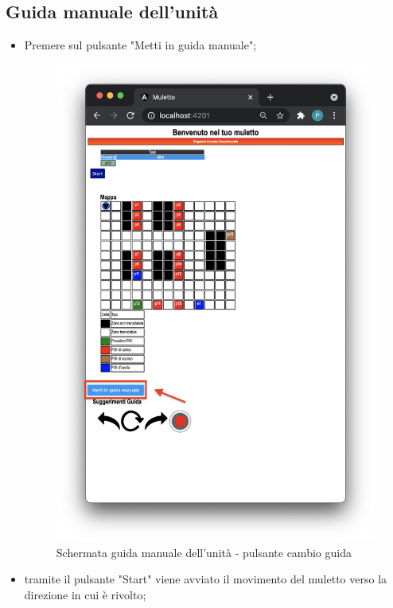 \subsection{Guida manuale dell'unità}
\begin{itemize}
    \item Premere sul pulsante "Metti in guida manuale";
    \begin{figure}[H]
        \centering
          \includegraphics[scale=0.45]{res/images/forklift_guidamanuale.png}
          \caption{Schermata guida manuale dell'unità - pulsante cambio guida}
    \end{figure}
    \item tramite il pulsante "Start" viene avviato il movimento del muletto verso la direzione in cui è rivolto;
    \begin{figure}[H]

\end{figure}
\end{itemize}
